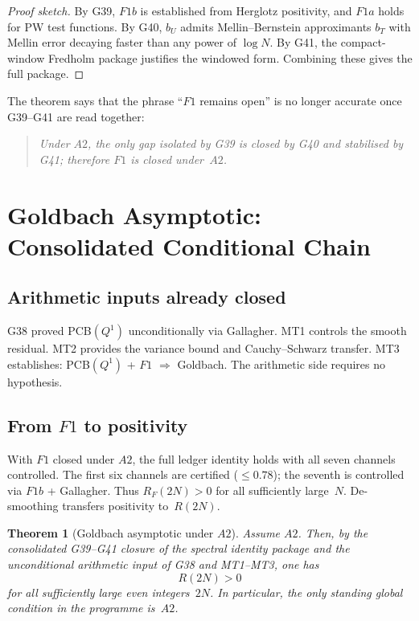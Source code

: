 \documentclass[11pt,a4paper]{article}
\newtheorem{theorem}{Theorem}[section]
\begin{document}
\begin{proof}[Proof sketch]
By G39, $F1b$ is established from Herglotz positivity, and $F1a$ holds for PW test functions.  By G40, $b_U$ admits Mellin--Bernstein approximants $b_T$ with Mellin error decaying faster than any power of $\log N$.  By G41, the compact-window Fredholm package justifies the windowed form.  Combining these gives the full package.
\end{proof}

The theorem says that the phrase ``$F1$ remains open'' is no longer accurate once G39--G41 are read together:

\begin{quote}
\emph{Under $A2$, the only gap isolated by G39 is closed by G40 and stabilised by G41; therefore $F1$ is closed under~$A2$.}
\end{quote}

\section{Goldbach Asymptotic: Consolidated Conditional Chain}

\subsection{Arithmetic inputs already closed}

G38 proved PCB$(Q^1)$ unconditionally via Gallagher.  MT1 controls the smooth residual.  MT2 provides the variance bound and Cauchy--Schwarz transfer.  MT3 establishes: PCB$(Q^1)$ + $F1$ $\Longrightarrow$ Goldbach.  The arithmetic side requires no hypothesis.

\subsection{From $F1$ to positivity}

With $F1$ closed under $A2$, the full ledger identity holds with all seven channels controlled.  The first six channels are certified ($\le 0.78$); the seventh is controlled via $F1b$ + Gallagher.  Thus $R_F(2N)>0$ for all sufficiently large~$N$.  De-smoothing transfers positivity to~$R(2N)$.

\begin{theorem}[Goldbach asymptotic under $A2$]
\label{thm:goldbach-A2}
Assume $A2$.  Then, by the consolidated G39--G41 closure of the spectral identity package and the unconditional arithmetic input of G38 and MT1--MT3, one has
\[
R(2N) > 0
\]
for all sufficiently large even integers~$2N$.  In particular, the only standing global condition in the programme is~$A2$.
\end{theorem}
\end{document}
